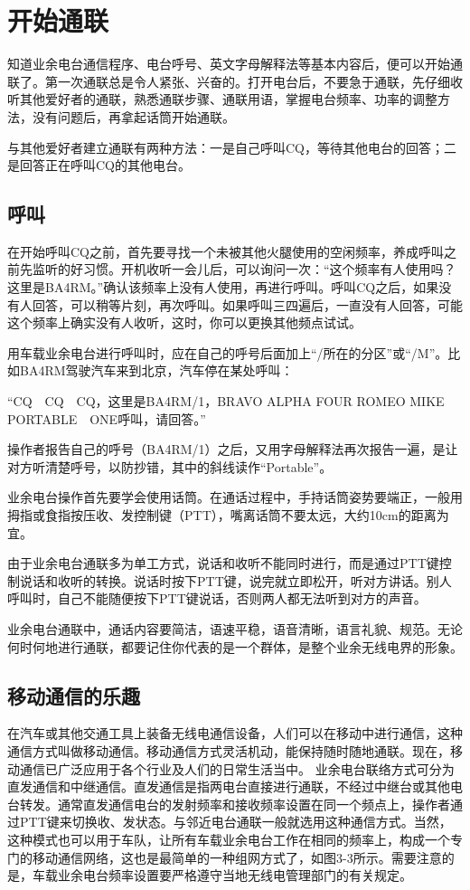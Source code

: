 \documentclass[12pt,UTF8]{ctexbook}
\begin{document}
\section{开始通联}

知道业余电台通信程序、电台呼号、英文字母解释法等基本内容后，便可以开始通联了。第一次通联总是令人紧张、兴奋的。打开电台后，不要急于通联，先仔细收听其他爱好者的通联，熟悉通联步骤、通联用语，掌握电台频率、功率的调整方法，没有问题后，再拿起话筒开始通联。

与其他爱好者建立通联有两种方法：一是自己呼叫CQ，等待其他电台的回答；二是回答正在呼叫CQ的其他电台。

\subsection{呼叫}

在开始呼叫CQ之前，首先要寻找一个未被其他火腿使用的空闲频率，养成呼叫之前先监听的好习惯。开机收听一会儿后，可以询问一次：“这个频率有人使用吗？这里是BA4RM。”确认该频率上没有人使用，再进行呼叫。呼叫CQ之后，如果没有人回答，可以稍等片刻，再次呼叫。如果呼叫三四遍后，一直没有人回答，可能这个频率上确实没有人收听，这时，你可以更换其他频点试试。

用车载业余电台进行呼叫时，应在自己的呼号后面加上“/所在的分区”或“/M”。比如BA4RM驾驶汽车来到北京，汽车停在某处呼叫：

“CQ　CQ　CQ，这里是BA4RM/1，BRAVO ALPHA FOUR ROMEO MIKE PORTABLE　ONE呼叫，请回答。”

操作者报告自己的呼号（BA4RM/1）之后，又用字母解释法再次报告一遍，是让对方听清楚呼号，以防抄错，其中的斜线读作“Portable”。

业余电台操作首先要学会使用话筒。在通话过程中，手持话筒姿势要端正，一般用拇指或食指按压收、发控制键（PTT），嘴离话筒不要太远，大约10cm的距离为宜。

由于业余电台通联多为单工方式，说话和收听不能同时进行，而是通过PTT键控制说话和收听的转换。说话时按下PTT键，说完就立即松开，听对方讲话。别人呼叫时，自己不能随便按下PTT键说话，否则两人都无法听到对方的声音。

业余电台通联中，通话内容要简洁，语速平稳，语音清晰，语言礼貌、规范。无论何时何地进行通联，都要记住你代表的是一个群体，是整个业余无线电界的形象。

\subsection{移动通信的乐趣}

在汽车或其他交通工具上装备无线电通信设备，人们可以在移动中进行通信，这种通信方式叫做移动通信。移动通信方式灵活机动，能保持随时随地通联。现在，移动通信已广泛应用于各个行业及人们的日常生活当中。
业余电台联络方式可分为直发通信和中继通信。直发通信是指两电台直接进行通联，不经过中继台或其他电台转发。通常直发通信电台的发射频率和接收频率设置在同一个频点上，操作者通过PTT键来切换收、发状态。与邻近电台通联一般就选用这种通信方式。当然，这种模式也可以用于车队，让所有车载业余电台工作在相同的频率上，构成一个专门的移动通信网络，这也是最简单的一种组网方式了，如图3-3所示。需要注意的是，车载业余电台频率设置要严格遵守当地无线电管理部门的有关规定。
\end{document}
